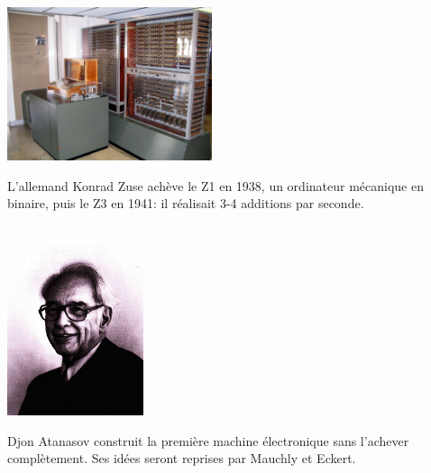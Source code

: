\documentclass[svgnames,11pt]{beamer}
\begin{document}
\begin{frame}
    \frametitle{}

    \begin{center}
    \centering
    \includegraphics[width=6cm]{ressources/zuse.jpg}
    \end{center}
\begin{aretenir}[1938-1941]
    L’allemand Konrad Zuse achève le Z1 en 1938, un ordinateur mécanique en binaire, puis le Z3 en 1941: il réalisait 3-4 additions par seconde.
\end{aretenir}
\end{frame}
\begin{frame}
    \frametitle{}

    \begin{center}
    \centering
    \includegraphics[width=4cm]{ressources/atanasoff.jpg}
    \end{center}
\begin{aretenir}[1942]
    Djon Atanasov construit la première machine électronique sans l'achever complètement. Ses idées seront reprises par Mauchly et Eckert.
\end{aretenir}
\end{frame}
\end{document}
